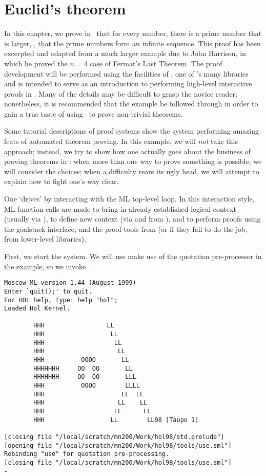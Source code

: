 
\chapter{Euclid's theorem}
\label{chap:euclid}

In this chapter, we prove in \holn\ that for every number, there is a
prime number that is larger, \ie, that the prime numbers form an
infinite sequence. This proof has been excerpted and adapted from a
much larger example due to John Harrison, in which he proved the $n =
4$ case of Fermat's Last Theorem. The proof development will be
performed using the facilities of , one of \HOL's many
libraries and is intended to serve as an introduction to performing
high-level interactive proofs in \holn.  Many of the details may be
difficult to grasp the novice reader; nonetheless, it is recommended
that the example be followed through in order to gain a true taste of
using \HOL\ to prove non-trivial theorems.

Some tutorial descriptions of proof systems show the system performing
amazing feats of automated theorem proving. In this example, we will
{\it not\/} take this approach; instead, we try to show how one
actually goes about the business of proving theorems in \holn{}: when
more than one way to prove something is possible, we will consider the
choices; when a difficulty rears its ugly head, we will attempt to
explain how to fight one's way clear.

One `drives' \holn{} by interacting with the ML top-level loop. In this
interaction style, ML function calls are made to bring in
already-established logical context (usually via ), to define
new context (via  and  from
), and to perform proofs using the goalstack interface, and
the proof tools from  (or if they fail to do the job, from
lower-level libraries).

First, we start the system. We will use make use of the quotation
pre-processor in the example, so we invoke
.
\setcounter{sessioncount}{1}
\begin{session}
\begin{verbatim}
Moscow ML version 1.44 (August 1999)
Enter `quit();' to quit.
For HOL help, type: help "hol";
Loaded Hol Kernel.

        HHH                 LL
        HHH                  LL
        HHH                   LL
        HHH                    LL
        HHH          OOOO       LL
        HHHHHHH     OO  OO       LL
        HHHHHHH     OO  OO       LLL
        HHH          OOOO        LLLL
        HHH                     LL  LL
        HHH                    LL    LL
        HHH                   LL      LL
        HHH                  LL        LL98 [Taupo 1]

[closing file "/local/scratch/mn200/Work/hol98/std.prelude"]
[opening file "/local/scratch/mn200/Work/hol98/tools/use.sml"]
Rebinding "use" for quotation pre-processing.
[closing file "/local/scratch/mn200/Work/hol98/tools/use.sml"]
-
\end{verbatim}
\end{session}

